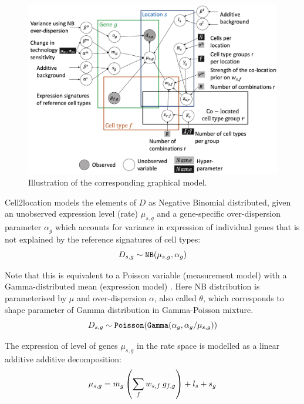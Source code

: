\documentclass[11pt,a4paper]{article}
\begin{document}
\begin{figure}
    \includegraphics[scale=0.4]{images/LocationModelLinearDependentW.png}
    \caption{Illustration of the corresponding graphical model.}
    \label{fig:graphical_model}
\end{figure}

Cell2location models the elements of $D$ as Negative Binomial distributed, given an unobserved expression level (rate) $\mu_{s,g}$ and a gene-specific over-dispersion parameter $\alpha_g$ which accounts for variance in expression of individual genes that is not explained by the reference signatures of cell types: 
\begin{equation} \label{eq:c2l:1}
D_{s,g} \sim \mathtt{NB}(\mu_{s,g}, \alpha_g) \\
\end{equation}

Note that this is equivalent to a Poisson variable (measurement model) with a Gamma-distributed mean (expression model)
\autocite{sarkar_separating_2020}. Here NB distribution is parameterised by $\mu$ and over-dispersion $\alpha$, also called $\theta$, which corresponds to shape parameter of Gamma distribution in Gamma-Poisson mixture.
\begin{equation} \label{eq:c2l:1}
D_{s,g} \sim \mathtt{Poisson}(\mathtt{Gamma}(\alpha_g, \alpha_g / \mu_{s,g})) \\
\end{equation}

The expression of level of genes $\mu_{s,g}$ in the rate space is modelled as a linear additive additive decomposition:
\begin{equation} \label{eq:c2l:3}
\mu_{s,g} = m_{g} \left (\sum_{f} {w_{s,f} \: g_{f,g}} \right) + l_s + s_{g}\\
\end{equation}
\end{document}
